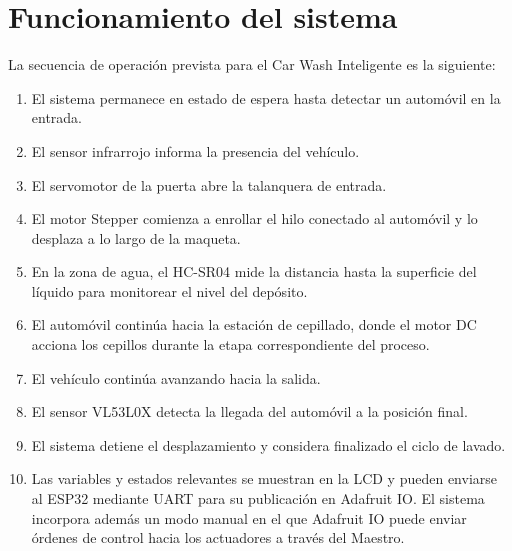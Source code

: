 \section{Funcionamiento del sistema}

La secuencia de operación prevista para el Car Wash Inteligente es la siguiente:

\begin{enumerate}[leftmargin=*]
    \item El sistema permanece en estado de espera hasta detectar un automóvil en la entrada.
    \item El sensor infrarrojo informa la presencia del vehículo.
    \item El servomotor de la puerta abre la talanquera de entrada.
    \item El motor Stepper comienza a enrollar el hilo conectado al automóvil y lo desplaza a lo largo de la maqueta.
    \item En la zona de agua, el HC-SR04 mide la distancia hasta la superficie del líquido para monitorear el nivel del depósito.
    \item El automóvil continúa hacia la estación de cepillado, donde el motor DC acciona los cepillos durante la etapa correspondiente del proceso.
    \item El vehículo continúa avanzando hacia la salida.
    \item El sensor VL53L0X detecta la llegada del automóvil a la posición final.
    \item El sistema detiene el desplazamiento y considera finalizado el ciclo de lavado.
    \item Las variables y estados relevantes se muestran en la LCD y pueden enviarse al ESP32 mediante UART para su publicación en Adafruit IO. El sistema incorpora además un modo manual en el que Adafruit IO puede enviar órdenes de control hacia los actuadores a través del Maestro.
\end{enumerate}

